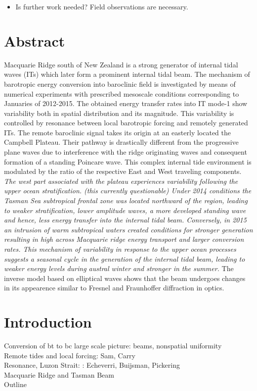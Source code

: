 \begin{itemize}
\item Is further work needed?
Field observations are necessary.

\end{itemize}

\section{Abstract}
Macquarie Ridge south of New Zealand is a strong generator of internal tidal waves (ITs) which later form a prominent internal tidal beam. The mechanism of barotropic energy conversion into baroclinic field is investigated by means of numerical experiments with prescribed mesoscale conditions corresponding to Januaries of 2012-2015. The obtained energy transfer rates into IT mode-1 show variability both in spatial distribution and its magnitude. This variability is controlled by resonance between local barotropic forcing and remotely generated ITs. The remote baroclinic signal takes its origin at an easterly located the Campbell Plateau. Their pathway is drastically different from the progressive plane waves due to interference with the ridge originating waves and consequent formation of a standing Poincare wave. This complex internal tide environment is modulated by the ratio of the respective East and West traveling components. \textit{The west part associated with the plateau experiences variability following the upper ocean stratification. (this currently questionable) Under 2014 conditions the Tasman Sea subtropical frontal zone was located northward of the region, leading to weaker stratification, lower amplitude waves, a more developed standing wave and hence, less energy transfer into the internal tidal beam. Conversely, in 2015 an intrusion of warm subtropical waters created conditions for stronger generation resulting in high across Macquarie ridge energy transport and larger conversion rates. This mechanism of variability in response to the upper ocean processes suggests a seasonal cycle in the generation of the internal tidal beam, leading to weaker energy levels during austral winter and stronger in the summer.}
The inverse model based on elliptical waves shows that the beam undergoes changes in its appearence similar to Fresnel and Fraunhoffer diffraction in optics.

\section{Introduction}
Conversion of bt to bc large scale picture: beams, nonspatial uniformity\\
Remote tides and local forcing: Sam, Carry\\
Resonance, Luzon Strait: : Echeverri, Buijsman, Pickering\\
Macquarie Ridge and Tasman Beam\\
Outline\\

